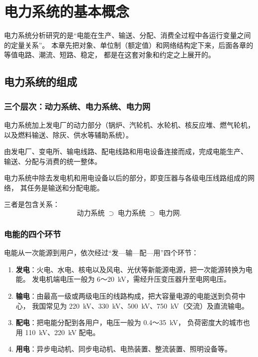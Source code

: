 
\chapter{电力系统的基本概念}

电力系统分析研究的是“电能在生产、输送、分配、消费全过程中各运行变量之间的定量关系”。
本章先把对象、单位制（额定值）和网络结构定下来，后面各章的等值电路、潮流、短路、稳定，
都是在这套对象和约定之上展开的。

\section{电力系统的组成}

\subsection{三个层次：动力系统、电力系统、电力网}

\begin{description}[leftmargin=4.5em,style=nextline]
  \item[动力系统] 电力系统加上发电厂的动力部分（锅炉、汽轮机、水轮机、核反应堆、燃气轮机，
        以及燃料输送、除灰、供水等辅助系统）。
  \item[电力系统] 由发电厂、变电所、输电线路、配电线路和用电设备连接而成，完成电能生产、
        输送、分配与消费的统一整体。
  \item[电力网] 电力系统中除去发电机和用电设备以后的部分，即变压器与各级电压线路组成的网络，
        其任务是输送和分配电能。
\end{description}

三者是包含关系：
\[
  \text{动力系统}\;\supset\;\text{电力系统}\;\supset\;\text{电力网}.
\]

\subsection{电能的四个环节}

电能从一次能源到用户，依次经过“发—输—配—用”四个环节：

\begin{enumerate}
  \item \textbf{发电}：火电、水电、核电以及风电、光伏等新能源电源，把一次能源转换为电能。
        发电机端电压一般为 6～20~kV，需经升压变压器升至电网电压。
  \item \textbf{输电}：由最高一级或两级电压的线路构成，把大容量电源的电能送到负荷中心，
        我国常见为 220~kV、330~kV、500~kV、750~kV（交流）及直流输电。
  \item \textbf{配电}：把电能分配到各用户，电压一般为 0.4～35~kV，
        负荷密度大的城市也用 110~kV、220~kV 配电。
  \item \textbf{用电}：异步电动机、同步电动机、电热装置、整流装置、照明设备等。
\end{enumerate}

